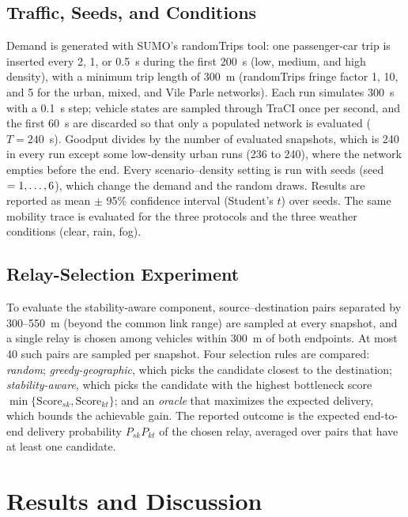 \documentclass[conference]{IEEEtran}
\begin{document}



\subsection{Traffic, Seeds, and Conditions}
Demand is generated with SUMO's randomTrips tool: one passenger-car trip is inserted every 2, 1, or 0.5~s during the first 200~s (low, medium, and high density), with a minimum trip length of 300~m (randomTrips fringe factor 1, 10, and 5 for the urban, mixed, and Vile Parle networks). Each run simulates 300~s with a 0.1~s step; vehicle states are sampled through TraCI once per second, and the first 60~s are discarded so that only a populated network is evaluated ($T=240$~s). Goodput divides by the number of evaluated snapshots, which is 240 in every run except some low-density urban runs (236 to 240), where the network empties before the end. Every scenario--density setting is run with \nSeeds{} seeds (seed $=1,\dots,6$), which change the demand and the random draws. Results are reported as mean $\pm$ 95\% confidence interval (Student's $t$) over seeds. The same mobility trace is evaluated for the three protocols and the three weather conditions (clear, rain, fog).

\subsection{Relay-Selection Experiment}
\label{sec:relaysetup}
To evaluate the stability-aware component, source--destination pairs separated by 300--550~m (beyond the common link range) are sampled at every snapshot, and a single relay is chosen among vehicles within 300~m of both endpoints. At most 40 such pairs are sampled per snapshot. Four selection rules are compared: \emph{random}; \emph{greedy-geographic}, which picks the candidate closest to the destination; \emph{stability-aware}, which picks the candidate with the highest bottleneck score $\min\{\mathrm{Score}_{sk},\mathrm{Score}_{kt}\}$; and an \emph{oracle} that maximizes the expected delivery, which bounds the achievable gain. The reported outcome is the expected end-to-end delivery probability $P_{sk}P_{kt}$ of the chosen relay, averaged over pairs that have at least one candidate.
 
 
\section{Results and Discussion}
\end{document}
